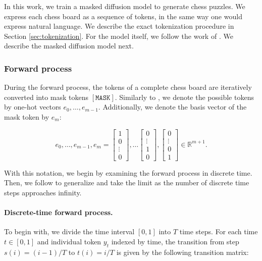 In this work, we train a masked diffusion model to generate chess puzzles. We express each chess board as a sequence of tokens, in the same way one would express natural language. We describe the exact tokenization procedure in Section \ref{sec:tokenization}. For the model itself, we follow the work of \citeauthor{shi2025simplifiedgeneralizedmaskeddiffusion} \cite{shi2025simplifiedgeneralizedmaskeddiffusion}. We describe the masked diffusion model next.


\subsubsection{Forward process}

During the forward process, the tokens of a complete chess board are iteratively converted into mask tokens $[\mathtt{MASK}]$. Similarly to \cite{shi2025simplifiedgeneralizedmaskeddiffusion}, we denote the possible tokens by one-hot vectors $e_0, \dots, e_{m - 1}$. Additionally, we denote the basis vector of the mask token by $e_m$:

\begin{equation*}
    e_0, \dots, e_{m - 1}, e_m = \begin{bmatrix}1\\0\\\vdots\\0\end{bmatrix},\dots\begin{bmatrix}0\\\vdots\\1\\0\end{bmatrix},\begin{bmatrix}0\\\vdots\\0\\1\end{bmatrix}\in\mathbb{R}^{m + 1}.
\end{equation*}

With this notation, we begin by examining the forward process in discrete time. Then, we follow \cite{shi2025simplifiedgeneralizedmaskeddiffusion} to generalize and take the limit as the number of discrete time steps approaches infinity.

\paragraph{Discrete-time forward process.}

To begin with, we divide the time interval $[0, 1]$ into $T$ time steps. For each time $t\in[0, 1]$ and individual token $y_t$ indexed by time, the transition from step $s(i) = (i - 1) / T$ to $t(i) = i / T$ is given by the following transition matrix:

